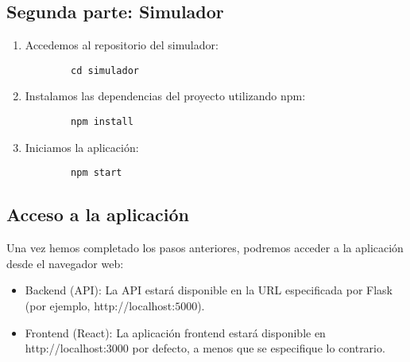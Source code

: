 \subsection{Segunda parte: Simulador}
\begin{enumerate}
	\item Accedemos al repositorio del simulador:
	\begin{verbatim}
		cd simulador
	\end{verbatim}
	\item Instalamos las dependencias del proyecto utilizando npm:
	\begin{verbatim}
		npm install
	\end{verbatim}
	\item Iniciamos la aplicación:
	\begin{verbatim}
		npm start
	\end{verbatim}
\end{enumerate}
\subsection{Acceso a la aplicación}
Una vez hemos completado los pasos anteriores, podremos acceder a la aplicación desde el navegador web:
\begin{itemize}
	\item Backend (API): La API estará disponible en la URL especificada por Flask (por ejemplo, http://localhost:$5000$).
	\item Frontend (React): La aplicación frontend estará disponible en http://localhost:$3000$ por defecto, a menos que se especifique lo contrario.
\end{itemize}

\endinput
